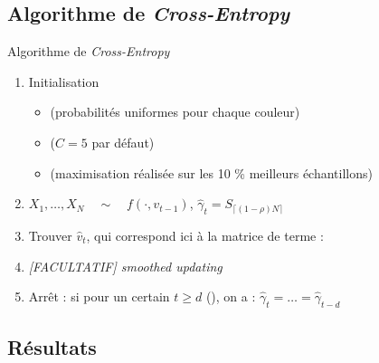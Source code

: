 \documentclass[10pt,xcolor=table,color={dvipsnames,usenames},ignorenonframetext,usepdftitle=false,french]{beamer}
\begin{document}
\hypertarget{algorithme-de-cross-entropy}{%
\subsection{\texorpdfstring{Algorithme de
\emph{Cross-Entropy}}{Algorithme de Cross-Entropy}}\label{algorithme-de-cross-entropy}}

\begin{frame}{Algorithme de \emph{Cross-Entropy}}
\protect\hypertarget{algorithme-de-cross-entropy-1}{}

\begin{enumerate}


\item Initialisation 

\begin{itemize}
\item 
{} (probabilités uniformes pour chaque couleur)
\item {} ($C=5$ par défaut)
\item {} (maximisation réalisée sur les 10 \% meilleurs échantillons)

\end{itemize}
 
\item $X_{1},\dots,X_{N} \quad  {\sim} \quad f(\cdot,v_{t-1})$, 
$\hat{\gamma}_{t}=S_{\lceil(1-\rho)N\rceil}$

\item Trouver $\hat{v}_{t}$, qui correspond ici à la matrice de terme  :

\item \emph{[FACULTATIF] smoothed updating}

\item Arrêt : si pour un certain $t\geq d$ (), on a : 
$\hat{\gamma}_{t}=\dots=\hat{\gamma}_{t-d}$

\end{enumerate}

\end{frame}

\hypertarget{ruxe9sultats}{%
\subsection{Résultats}\label{ruxe9sultats}}
\end{document}
